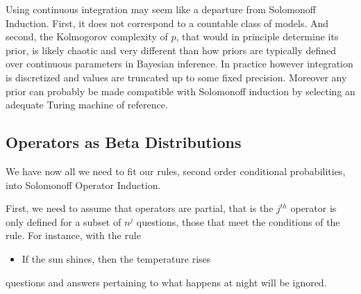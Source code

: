 \documentclass[runningheads]{llncs}
\begin{document}
Using continuous integration may seem like a departure from Solomonoff
Induction. First, it does not correspond to a countable class of
models. And second, the Kolmogorov complexity of $p$, that would in
principle determine its prior, is likely chaotic and very different
than how priors are typically defined over continuous parameters in
Bayesian inference. In practice however integration is discretized and
values are truncated up to some fixed precision. Moreover any prior
can probably be made compatible with Solomonoff induction by selecting
an adequate Turing machine of reference.
\subsection{Operators as Beta Distributions}
\label{beta-op}
We have now all we need to fit our rules, second order conditional
probabilities, into Solomonoff Operator Induction.

First, we need to assume that operators are partial, that is the
$j^{th}$ operator is only defined for a subset of $n^j$ questions,
those that meet the conditions of the rule. For instance, with the
rule
\begin{itemize}
\item If the sun shines, then the temperature rises
\end{itemize}
questions and answers pertaining to what happens at night will be
ignored.
\end{document}
